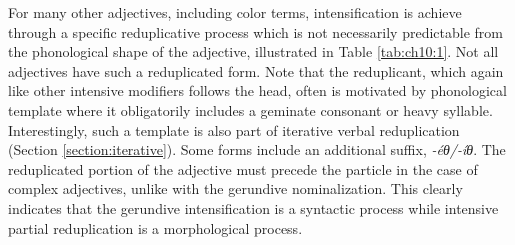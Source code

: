 For many other adjectives, including color terms, intensification is achieve through a specific reduplicative process which is not necessarily predictable from the phonological shape of the adjective, illustrated in Table \ref{tab:ch10:1}. Not all adjectives have such a reduplicated form. Note that the reduplicant, which again like other intensive modifiers follows the head, often is motivated by phonological template where it obligatorily includes a geminate consonant or heavy syllable. Interestingly, such a template is also part of iterative verbal reduplication (Section \ref{section:iterative}). Some forms include an additional suffix, \textit{-éθ/-íθ}. The reduplicated portion of the adjective must precede the particle in the case of complex adjectives, unlike with the gerundive nominalization. This clearly indicates that the gerundive intensification is a syntactic process while intensive partial reduplication is a morphological process.

